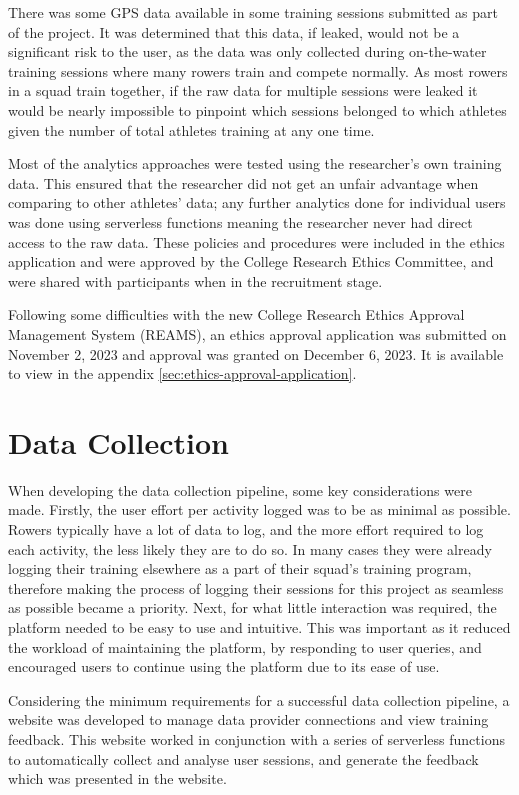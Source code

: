 There was some GPS data available in some training sessions submitted as part of the project. It was determined that this data, if leaked, would not be a significant risk to the user, as the data was only collected during on-the-water training sessions where many rowers train and compete normally. As most rowers in a squad train together, if the raw data for multiple sessions were leaked it would be nearly impossible to pinpoint which sessions belonged to which athletes given the number of total athletes training at any one time. 

Most of the analytics approaches were tested using the researcher's own training data. This ensured that the researcher did not get an unfair advantage when comparing to other athletes' data; any further analytics done for individual users was done using serverless functions meaning the researcher never had direct access to the raw data. These policies and procedures were included in the ethics application and were approved by the College Research Ethics Committee, and were shared with participants when in the recruitment stage. 

Following some difficulties with the new College Research Ethics Approval Management System (REAMS), an ethics approval application was submitted on November 2, 2023 and approval was granted on December 6, 2023. It is available to view in the appendix \ref{sec:ethics-approval-application}.

\section{Data Collection}
When developing the data collection pipeline, some key considerations were made. Firstly, the user effort per activity logged was to be as minimal as possible. Rowers typically have a lot of data to log, and the more effort required to log each activity, the less likely they are to do so. In many cases they were already logging their training elsewhere as a part of their squad's training program, therefore making the process of logging their sessions for this project as seamless as possible became a priority. Next, for what little interaction was required, the platform needed to be easy to use and intuitive. This was important as it reduced the workload of maintaining the platform, by responding to user queries, and encouraged users to continue using the platform due to its ease of use.

Considering the minimum requirements for a successful data collection pipeline, a website was developed to manage data provider connections and view training feedback. This website worked in conjunction with a series of serverless functions to automatically collect and analyse user sessions, and generate the feedback which was presented in the website.


